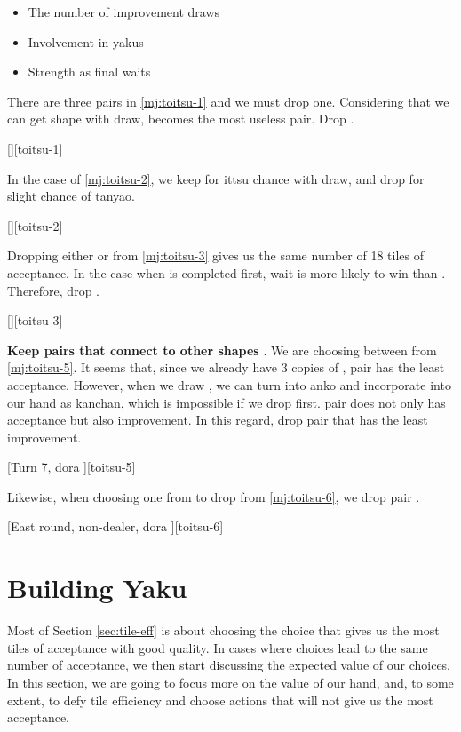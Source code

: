 \documentclass[12pt]{article}
\begin{document}
\begin{itemize}
\item The number of improvement draws
\item Involvement in yakus
\item Strength as final waits
\end{itemize}

There are three pairs in \ref{mj:toitsu-1} and we must drop one. Considering that we can get  shape with  draw,  becomes the most useless pair. Drop .

[][toitsu-1]

In the case of \ref{mj:toitsu-2}, we keep  for ittsu chance with  draw, and drop  for slight chance of tanyao.

[][toitsu-2]

Dropping either  or  from \ref{mj:toitsu-3} gives us the same number of 18 tiles of acceptance. In the case when  is completed first,  wait is more likely to win than . Therefore, drop .

[][toitsu-3]

\textbf{Keep pairs that connect to other shapes} \citep[][pp.~78--79]{fkt}. We are choosing between  from \ref{mj:toitsu-5}. It seems that, since we already have 3 copies of ,  pair has the least acceptance. However, when we draw , we can turn  into anko and incorporate  into our hand as  kanchan, which is impossible if we drop  first.  pair does not only has  acceptance but also  improvement. In this regard, drop  pair that has the least improvement.

[Turn 7, dora ][toitsu-5]

Likewise, when choosing one from  to drop from \ref{mj:toitsu-6}, we drop  pair \citep[][pp.~80--81]{fkt}.

[East round, non-dealer, dora ][toitsu-6]


\section{Building Yaku} \label{sec:yaku}

Most of Section \ref{sec:tile-eff} is about choosing the choice that gives us the most tiles of acceptance with good quality. In cases where choices lead to the same number of acceptance, we then start discussing the expected value of our choices. In this section, we are going to focus more on the value of our hand, and, to some extent, to defy tile efficiency and choose actions that will not give us the most acceptance.
\end{document}
